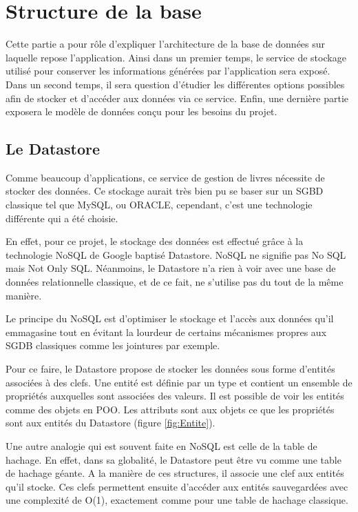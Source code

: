 \chapter{Structure de la base}
Cette partie a pour rôle d’expliquer l’architecture de la base de données sur laquelle repose l’application. Ainsi dans un premier temps, le service de stockage utilisé pour conserver les informations générées par l’application sera exposé. Dans un second temps, il sera question d’étudier les différentes options possibles afin de stocker et d’accéder aux données via ce service. Enfin, une dernière partie exposera le modèle de données conçu pour les besoins du projet.

\section{Le Datastore}
Comme beaucoup d’applications, ce service de gestion de livres nécessite de stocker des données. Ce stockage aurait très bien pu se baser sur un SGBD classique tel que MySQL, ou ORACLE, cependant, c’est une technologie différente qui a été choisie.

En effet, pour ce projet, le stockage des données est effectué grâce à la technologie NoSQL de Google baptisé Datastore. NoSQL ne signifie pas No SQL mais Not Only SQL. Néanmoins, le Datastore n’a rien à voir avec une base de données relationnelle classique, et de ce fait, ne s’utilise pas du tout de la même manière.

Le principe du NoSQL est d’optimiser le stockage et l’accès aux données qu’il emmagasine tout en évitant la lourdeur de certains mécanismes propres aux SGDB classiques comme les jointures par exemple. 

Pour ce faire, le Datastore propose de stocker les données sous forme d’entités associées à des clefs. Une entité est définie par un type et contient un ensemble de propriétés auxquelles sont associées des valeurs. Il est possible de voir les entités comme des objets en POO. Les attributs sont aux objets ce que les propriétés sont aux entités du Datastore (figure \ref{fig:Entite}).


Une autre analogie qui est souvent faite en NoSQL est celle de la table de hachage. En effet, dans sa globalité, le Datastore  peut être vu comme une table de hachage géante. A la manière de ces structures, il associe une clef aux entités qu’il stocke. Ces clefs permettent ensuite d’accéder aux entités sauvegardées avec une complexité de O(1), exactement comme pour une table de hachage classique. 

